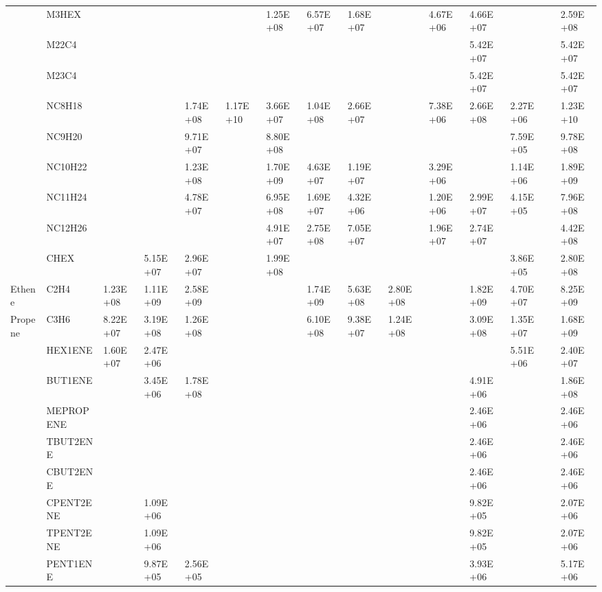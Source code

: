 \begin{longtable}{lllllllllllllll}
	 & M3HEX &  &  &  &  & 1.25E+08 & 6.57E+07 & 1.68E+07 &  & 4.67E+06 & 4.66E+07 &  &  & 2.59E+08 \\
	 & M22C4 &  &  &  &  &  &  &  &  &  & 5.42E+07 &  &  & 5.42E+07 \\
	 & M23C4 &  &  &  &  &  &  &  &  &  & 5.42E+07 &  &  & 5.42E+07 \\
	 & NC8H18 &  &  & 1.74E+08 & 1.17E+10 & 3.66E+07 & 1.04E+08 & 2.66E+07 &  & 7.38E+06 & 2.66E+08 & 2.27E+06 &  & 1.23E+10 \\
	 & NC9H20 &  &  & 9.71E+07 &  & 8.80E+08 &  &  &  &  &  & 7.59E+05 &  & 9.78E+08 \\
	 & NC10H22 &  &  & 1.23E+08 &  & 1.70E+09 & 4.63E+07 & 1.19E+07 &  & 3.29E+06 &  & 1.14E+06 &  & 1.89E+09 \\
	 & NC11H24 &  &  & 4.78E+07 &  & 6.95E+08 & 1.69E+07 & 4.32E+06 &  & 1.20E+06 & 2.99E+07 & 4.15E+05 &  & 7.96E+08 \\
	 & NC12H26 &  &  &  &  & 4.91E+07 & 2.75E+08 & 7.05E+07 &  & 1.96E+07 & 2.74E+07 &  &  & 4.42E+08 \\
	 & CHEX &  & 5.15E+07 & 2.96E+07 &  & 1.99E+08 &  &  &  &  &  & 3.86E+05 &  & 2.80E+08 \\
	\hline Ethene & C2H4 & 1.23E+08 & 1.11E+09 & 2.58E+09 &  &  & 1.74E+09 & 5.63E+08 & 2.80E+08 &  & 1.82E+09 & 4.70E+07 &  & 8.25E+09 \\ \hline
	Propene & C3H6 & 8.22E+07 & 3.19E+08 & 1.26E+08 &  &  & 6.10E+08 & 9.38E+07 & 1.24E+08 &  & 3.09E+08 & 1.35E+07 &  & 1.68E+09 \\
	\hline \parbox[t]{2mm}{} & HEX1ENE & 1.60E+07 & 2.47E+06 &  &  &  &  &  &  &  &  & 5.51E+06 &  & 2.40E+07 \\
	 & BUT1ENE &  & 3.45E+06 & 1.78E+08 &  &  &  &  &  &  & 4.91E+06 &  &  & 1.86E+08 \\
	 & MEPROPENE &  &  &  &  &  &  &  &  &  & 2.46E+06 &  &  & 2.46E+06 \\
	 & TBUT2ENE &  &  &  &  &  &  &  &  &  & 2.46E+06 &  &  & 2.46E+06 \\
	 & CBUT2ENE &  &  &  &  &  &  &  &  &  & 2.46E+06 &  &  & 2.46E+06 \\
	 & CPENT2ENE &  & 1.09E+06 &  &  &  &  &  &  &  & 9.82E+05 &  &  & 2.07E+06 \\
	 & TPENT2ENE &  & 1.09E+06 &  &  &  &  &  &  &  & 9.82E+05 &  &  & 2.07E+06 \\
	 & PENT1ENE &  & 9.87E+05 & 2.56E+05 &  &  &  &  &  &  & 3.93E+06 &  &  & 5.17E+06 \\

\end{longtable}
